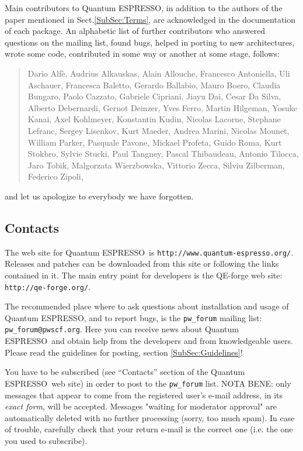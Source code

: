 \documentclass[12pt,a4paper]{article}
\def\qe{{\sc Quantum ESPRESSO}}
\begin{document}
Main contributors to \qe, in addition to the authors of the paper 
mentioned in Sect.\ref{SubSec:Terms}, are acknowledged in the 
documentation of each package. An alphabetic list of further
contributors who answered questions on the mailing list, found 
bugs, helped in porting to new architectures, wrote some code,
contributed in some way or another at some stage, follows:
\begin{quote}
  Dario Alf\`e, Audrius Alkauskas, Alain Allouche, Francesco Antoniella,
  Uli Aschauer,  Francesca Baletto, Gerardo Ballabio, Mauro Boero, 
  Claudia Bungaro, Paolo Cazzato, Gabriele Cipriani, Jiayu Dai,
  Cesar Da Silva, Alberto Debernardi, Gernot Deinzer, Yves Ferro,
  Martin Hilgeman, Yosuke Kanai, Axel Kohlmeyer, Konstantin Kudin,
  Nicolas Lacorne, Stephane Lefranc, Sergey Lisenkov, 
  Kurt Maeder, Andrea Marini, Nicolas Mounet, William Parker,
  Pasquale Pavone, Mickael Profeta, Guido Roma, Kurt Stokbro, 
  Sylvie Stucki, Paul Tangney,  Pascal Thibaudeau, Antonio Tilocca,
  Jaro Tobik, Malgorzata Wierzbowska, Vittorio Zecca,
  Silviu Zilberman, Federico Zipoli,
\end{quote}
and let us apologize to everybody we have forgotten.
 
\subsection{Contacts}
\label{SubSec:Contacts}

The web site for \qe\ is \texttt{http://www.quantum-espresso.org/}.
Releases and patches can be downloaded from this
site or following the links contained in it. The main entry point for 
developers is the QE-forge web site:
\texttt{http://qe-forge.org/}.

The recommended place where to ask questions about installation 
and usage of \qe, and to report bugs, is the \texttt{pw\_forum} 
mailing list: \texttt{pw\_forum@pwscf.org}. Here you can receive
news about \qe\ and obtain help from the developers and from 
knowledgeable users. Please read the guidelines for posting,
section \ref{SubSec:Guidelines}!

You have to be subscribed (see ``Contacts'' section of the \qe\ web site)
in order to post to the  \texttt{pw\_forum} list. 
NOTA BENE: only messages that appear to come from the 
registered user's e-mail address, in its {\em exact form}, will be
accepted. Messages "waiting for moderator approval" are
automatically deleted with no further processing (sorry, too 
much spam). In case of trouble, carefully check that your return 
e-mail is the correct one (i.e. the one you used to subscribe).
\end{document}
